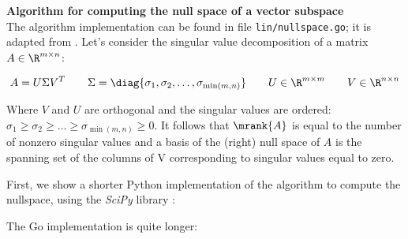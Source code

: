 \begin{defn}
  \textbf{Algorithm for computing the null space of a vector subspace} \\
  The algorithm implementation can be found in file \texttt{lin/nullspace.go}; it is
  adapted from \cite{scipy/ranknullspace}. 
  Let's consider the singular value decomposition of a matrix $A \in \R^{m \times n}$:

  \begin{equation*}
    \begin{aligned}
      A = U \Sigma V^T & \quad & \Sigma = \diag{\sigma_1, \sigma_2, \hdots, \sigma_{\min(m, n)}  } 
       & \quad &  U \in \R^{m \times m} & \quad & V \in \R^{n \times n}
    \end{aligned}
  \end{equation*}

  Where $V$ and $U$ are orthogonal and the singular values are ordered: $\sigma_1 \geq \sigma_2 \geq \hdots \geq \sigma_{\min(m,n)} \geq 0$.
  It follows that $\mrank{A}$ is equal to the number of nonzero singular values and
  a basis of the (right) null space of $A$ is the spanning set of the columns of V
  corresponding to singular values equal to zero. 
\end{defn}

\begin{exmp}
  First, we show a shorter Python 
  implementation of the algorithm to compute the nullspace, using the 
  \textit{SciPy} library \cite{scipy/ranknullspace}:

  

    The Go implementation is quite longer:

    

\end{exmp}
